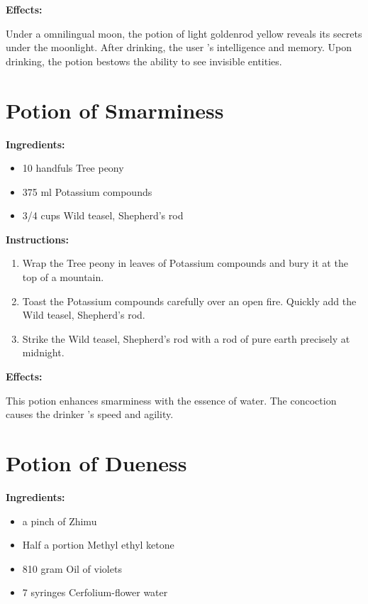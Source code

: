 \documentclass{article}
\begin{document}
\textbf{Effects:}

Under a omnilingual moon, the potion of light goldenrod yellow reveals its secrets under the moonlight. After drinking, the user 's intelligence and memory. Upon drinking, the potion bestows the ability to see invisible entities.

\newpage
\section*{Potion of Smarminess}

\textbf{Ingredients:}

\begin{itemize}
  \item 10 handfuls Tree peony
  \item 375 ml Potassium compounds
  \item 3/4 cups Wild teasel, Shepherd's rod
\end{itemize}

\textbf{Instructions:}

\begin{enumerate}
  \item Wrap the Tree peony in leaves of Potassium compounds and bury it at the top of a mountain.
  \item Toast the Potassium compounds carefully over an open fire. Quickly add the Wild teasel, Shepherd's rod.
  \item Strike the Wild teasel, Shepherd's rod with a rod of pure earth precisely at midnight.
\end{enumerate}

\textbf{Effects:}

This potion enhances smarminess with the essence of water. The concoction causes the drinker 's speed and agility.

\newpage
\section*{Potion of Dueness}

\textbf{Ingredients:}

\begin{itemize}
  \item a pinch of Zhimu
  \item Half a portion Methyl ethyl ketone
  \item 810 gram Oil of violets
  \item 7 syringes Cerfolium-flower water
\end{itemize}
\end{document}
